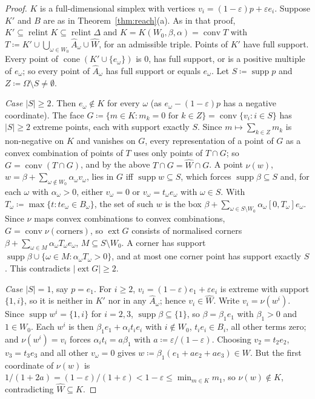 \documentclass[11pt]{article}
\DeclareMathOperator{\conv}{conv}
\DeclareMathOperator{\cone}{cone}
\DeclareMathOperator{\relint}{relint}
\DeclareMathOperator{\supp}{supp}
\DeclareMathOperator{\ext}{ext}
\theoremstyle{plain}
\theoremstyle{definition}
\theoremstyle{remark}
\begin{document}
\begin{proof}
$K$ is a full-dimensional simplex with vertices $v_i=(1-\varepsilon)p+\varepsilon e_i$.
Suppose $K'$ and $B$ are as in Theorem~\ref{thm:reach}(a). As in that proof, $K'\subseteq
\relint K\subseteq\relint\Delta$ and $K=K(W_0,\beta,\alpha)=\conv T$ with $T\coloneqq
K'\cup\bigcup_{\omega\in W_0}\hat A_\omega\cup\hat W$, for an admissible triple. Points of
$K'$ have full support. Every point of $\cone(K'\cup\{e_\omega\})$ is $0$, has full
support, or is a positive multiple of $e_\omega$; so every point of $\hat A_\omega$ has
full support or equals $e_\omega$. Let $S\coloneqq\supp p$ and $Z\coloneqq\Omega\setminus
S\neq\emptyset$.

\emph{Case $|S|\ge2$.} Then $e_\omega\notin K$ for every $\omega$ (as $e_\omega-(1-
\varepsilon)p$ has a negative coordinate). The face $G\coloneqq\{m\in K:m_k=0\text{ for }
k\in Z\}=\conv\{v_i:i\in S\}$ has $|S|\ge2$ extreme points, each with support exactly $S$.
Since $m\mapsto\sum_{k\in Z}m_k$ is non-negative on $K$ and vanishes on $G$, every
representation of a point of $G$ as a convex combination of points of $T$ uses only points
of $T\cap G$; so $G=\conv(T\cap G)$, and by the above $T\cap G=\hat W\cap G$. A point $\nu(w)$, $w=\beta+\sum_{\omega\notin W_0}\alpha_\omega v_\omega$, lies in $G$
iff $\supp w\subseteq S$, which forces $\supp\beta\subseteq S$ and, for each $\omega$ with
$\alpha_\omega>0$, either $v_\omega=0$ or $v_\omega=t_\omega e_\omega$ with $\omega\in S$.
With $T_\omega\coloneqq\max\{t:te_\omega\in B_\omega\}$, the set of such $w$ is the box
$\beta+\sum_{\omega\in S\setminus W_0}\alpha_\omega[0,T_\omega]e_\omega$. Since $\nu$ maps
convex combinations to convex combinations, $G=\conv\nu(\text{corners})$, so $\ext G$
consists of normalised corners $\beta+\sum_{\omega\in M}\alpha_\omega T_\omega e_\omega$,
$M\subseteq S\setminus W_0$. A corner has support $\supp\beta\cup\{\omega\in M:
\alpha_\omega T_\omega>0\}$, and at most one corner point has support exactly $S$. This
contradicts $|\ext G|\ge2$.

\emph{Case $|S|=1$}, say $p=e_1$. For $i\ge2$, $v_i=(1-\varepsilon)e_1+\varepsilon e_i$ is
extreme with support $\{1,i\}$, so it is neither in $K'$ nor in any $\hat A_\omega$; hence
$v_i\in\hat W$. Write $v_i=\nu(w^i)$. Since $\supp w^i=\{1,i\}$ for $i=2,3$, $\supp\beta
\subseteq\{1\}$, so $\beta=\beta_1e_1$ with $\beta_1>0$ and $1\in W_0$. Each $w^i$ is then
$\beta_1e_1+\alpha_it_ie_i$ with $i\notin W_0$, $t_ie_i\in B_i$, all other terms zero; and
$\nu(w^i)=v_i$ forces $\alpha_it_i=a\beta_1$ with $a\coloneqq\varepsilon/(1-\varepsilon)$.
Choosing $v_2=t_2e_2$, $v_3=t_3e_3$ and all other $v_\omega=0$ gives $w\coloneqq\beta_1(e_1
+ae_2+ae_3)\in W$. But the first coordinate of $\nu(w)$ is $1/(1+2a)=(1-\varepsilon)/
(1+\varepsilon)<1-\varepsilon\le\min_{m\in K}m_1$, so $\nu(w)\notin K$, contradicting
$\hat W\subseteq K$.
\end{proof}
\end{document}
